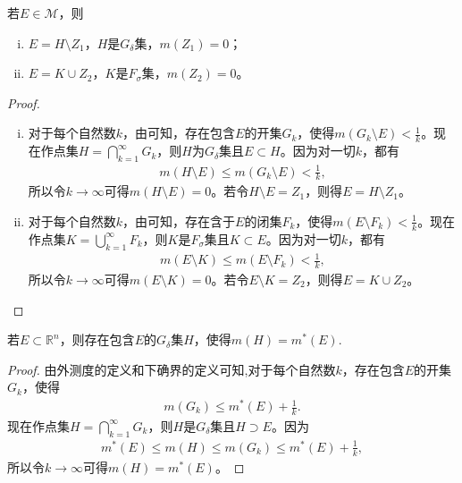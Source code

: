 \documentclass[../../main.tex]{subfiles}
\begin{document}
\begin{theorem}\label{theorem:定理2.14}
若$E\in\mathscr{M}$，则
\begin{enumerate}[(i)]
\item $E = H\setminus Z_1$，$H$是$G_\delta$集，$m(Z_1)=0$；
\item $E = K\cup Z_2$，$K$是$F_\sigma$集，$m(Z_2)=0$。
\end{enumerate}
\end{theorem}
\begin{proof}
\begin{enumerate}[(i)]
\item 对于每个自然数$k$，由可知，存在包含$E$的开集$G_k$，使得$m(G_k\setminus E)<\frac{1}{k}$。现在作点集$H = \bigcap_{k = 1}^{\infty}G_k$，则$H$为$G_\delta$集且$E\subset H$。因为对一切$k$，都有
\begin{align*}
m(H\setminus E)\leqslant m(G_k\setminus E)<\frac{1}{k},
\end{align*}
所以令$k\to \infty$可得$m(H\setminus E)=0$。若令$H\setminus E = Z_1$，则得$E = H\setminus Z_1$。
\item 对于每个自然数$k$，由可知，存在含于$E$的闭集$F_k$，使得$m(E\setminus F_k)<\frac{1}{k}$。现在作点集$K = \bigcup_{k = 1}^{\infty}F_k$，则$K$是$F_\sigma$集且$K\subset E$。因为对一切$k$，都有
\begin{align*}
m(E\setminus K)\leqslant m(E\setminus F_k)<\frac{1}{k},
\end{align*}
所以令$k\to \infty$可得$m(E\setminus K)=0$。若令$E\setminus K = Z_2$，则得$E = K\cup Z_2$。
\end{enumerate}
\end{proof} 

\begin{theorem}[外测度的正则性]\label{theorem:外测度的正则性}
若\(E \subset \mathbb{R}^n\)，则存在包含\(E\)的\(G_\delta\)集\(H\)，使得\(m(H)=m^*(E)\).
\end{theorem}
\begin{proof}
由外测度的定义和下确界的定义可知,对于每个自然数\(k\)，存在包含\(E\)的开集\(G_k\)，使得
\begin{align*}
m(G_k) \leqslant m^*(E) + \frac{1}{k}.
\end{align*}
现在作点集\(H = \bigcap_{k = 1}^{\infty}G_k\)，则\(H\)是\(G_\delta\)集且\(H \supset E\)。因为
\begin{align*}
m^*(E) \leqslant m(H) \leqslant m(G_k) \leqslant m^*(E) + \frac{1}{k},
\end{align*}
所以令$k\to \infty$可得\(m(H)=m^*(E)\)。
\end{proof}
\end{document}
